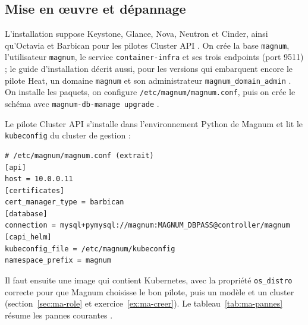 \subsection{Mise en œuvre et dépannage}\label{sec:ma-deploiement}

L'installation suppose Keystone, Glance, Nova, Neutron et Cinder, ainsi qu'Octavia et Barbican pour les pilotes Cluster API
\parencite{magnum-capi-helm-user}. On crée la base \texttt{magnum}, l'utilisateur \texttt{magnum}, le service
\texttt{container-infra} et ses trois endpoints (port 9511) ; le guide d'installation décrit aussi, pour les versions qui
embarquent encore le pilote Heat, un domaine \texttt{magnum} et son administrateur \texttt{magnum\_domain\_admin}
\parencite{magnum-install}. On installe les paquets, on configure \texttt{/etc/magnum/magnum.conf}, puis on crée le schéma avec
\texttt{magnum-db-manage upgrade} \parencite{magnum-install}.

Le pilote Cluster API s'installe dans l'environnement Python de Magnum et lit le \texttt{kubeconfig} du cluster de gestion
\parencite{magnum-capi-helm-install} :

\par\noindent\begin{minipage}{\linewidth}
\begin{lstlisting}
# /etc/magnum/magnum.conf (extrait)
[api]
host = 10.0.0.11
[certificates]
cert_manager_type = barbican
[database]
connection = mysql+pymysql://magnum:MAGNUM_DBPASS@controller/magnum
[capi_helm]
kubeconfig_file = /etc/magnum/kubeconfig
namespace_prefix = magnum
\end{lstlisting}
\end{minipage}\par

Il faut ensuite une image qui contient Kubernetes, avec la propriété \texttt{os\_distro} correcte pour que Magnum choisisse le
bon pilote, puis un modèle et un cluster (section~\ref{sec:ma-role} et exercice~\ref{ex:ma-creer}). Le tableau~\ref{tab:ma-pannes} résume les pannes courantes
\parencite{magnum-troubleshooting,magnum-capi-helm-user,magnum-cluster-api}.

